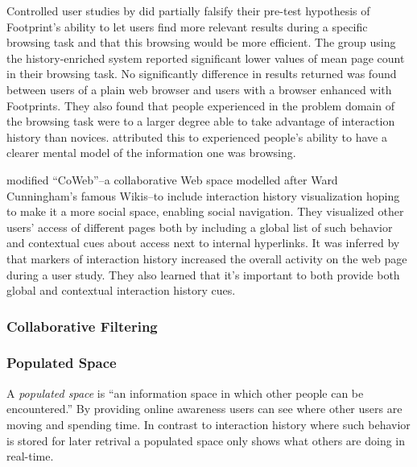 Controlled user studies by \citeauthor{wexelblat99} did partially falsify
their pre-test hypothesis of Footprint's ability to let users find more
relevant results during a specific browsing task and that this browsing
would be more efficient. The group using the history-enriched system reported
significant lower values of mean page count in their browsing task. No
significantly difference in results returned was found between users of a
plain web browser and users with a browser enhanced with Footprints. They also
found that people experienced in the problem domain of the browsing task were
to a larger degree able to take advantage of interaction history than novices.
\citeauthor{wexelblat99} attributed this to experienced people's ability to
have a clearer mental model of the information one was browsing.

\citet{dieberger00a} modified ``CoWeb''--a collaborative Web space
modelled after Ward Cunningham's famous Wikis--to include interaction history
visualization hoping to make it a more social space, enabling social
navigation. They visualized other users' access of different pages both by
including a global list of such behavior and contextual cues about access
next to internal hyperlinks.
It was inferred by \citeauthor{dieberger00a} that markers of interaction
history increased the overall activity on the web page during a user study.
They also learned that it's important to both provide both global and
contextual interaction history cues.


\subsubsection{Collaborative Filtering}

\subsubsection{Populated Space}

A \emph{populated space} is
  ``an information space in which other people
  can be encountered.'' \citep[p.~41]{dieberger00b}
By providing online awareness users can see where other users are moving and
spending time. In contrast to interaction history where such behavior is
stored for later retrival a populated space only shows what others are doing
in real-time.

